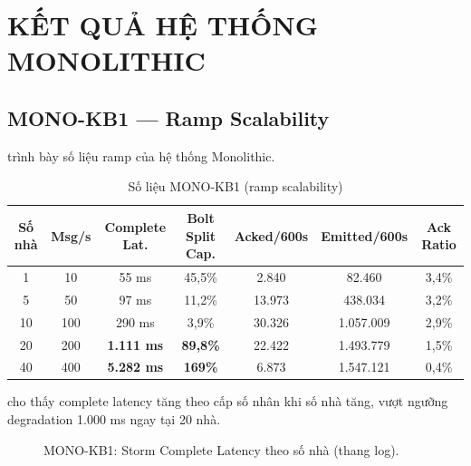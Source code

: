 \documentclass[13pt,a4paper]{report}
\begin{document}
\chapter{KẾT QUẢ HỆ THỐNG MONOLITHIC}
\label{ch:ketqua-mono}

\section{MONO-KB1 --- Ramp Scalability}

 trình bày số liệu ramp của hệ thống Monolithic.

\begin{table}[H]
\centering
\caption{Số liệu MONO-KB1 (ramp scalability)}
\label{tab:mono-kb1}
\small
\begin{tabular}{c c c c c c c}
\toprule
\textbf{Số nhà} & \textbf{Msg/s} & \textbf{Complete Lat.} & \textbf{Bolt Split Cap.} & \textbf{Acked/600s} & \textbf{Emitted/600s} & \textbf{Ack Ratio} \\
\midrule
1  & 10  & 55 ms              & 45,5\%            & 2.840  & 82.460    & 3,4\% \\
5  & 50  & 97 ms              & 11,2\%            & 13.973 & 438.034   & 3,2\% \\
10 & 100 & 290 ms             & 3,9\%             & 30.326 & 1.057.009 & 2,9\% \\
20 & 200 & \textbf{1.111 ms}  & \textbf{89,8\%}   & 22.422 & 1.493.779 & 1,5\% \\
40 & 400 & \textbf{5.282 ms}  & \textbf{169\%}    & 6.873  & 1.547.121 & 0,4\% \\
\bottomrule
\end{tabular}
\end{table}

 cho thấy complete latency tăng theo cấp số nhân khi số nhà
tăng, vượt ngưỡng degradation 1.000 ms ngay tại 20 nhà.

\begin{figure}[H]
\centering
{}
\caption{MONO-KB1: Storm Complete Latency theo số nhà (thang log).}
\label{fig:mono-cl}
\end{figure}
\end{document}
